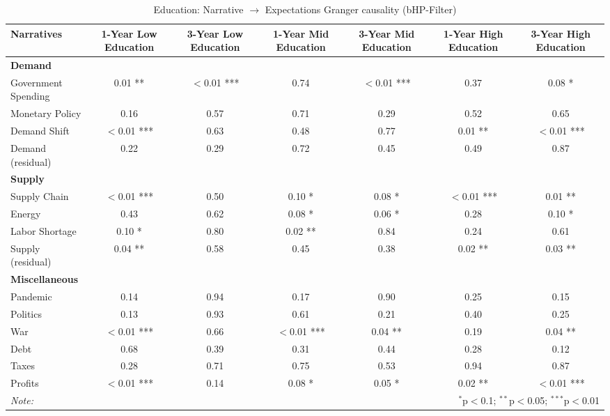 \begin{sidewaystable}[H]
\centering
\footnotesize
\caption{Education: Narrative $\rightarrow$ Expectations Granger causality (bHP-Filter)}\label{tab:granger_bHP_educ}

\begin{tabular}{lcccccc}
\toprule
\textbf{Narratives} & \textbf{1-Year Low Education} & \textbf{3-Year Low Education} & \textbf{1-Year Mid Education} & \textbf{3-Year Mid Education} & \textbf{1-Year High Education} & \textbf{3-Year High Education} \\
\midrule
\multicolumn{7}{l}{\textbf{Demand}} \\
\midrule
Government Spending & 0.01 ** & $<$0.01 *** & 0.74 & $<$0.01 *** & 0.37 & 0.08 * \\
Monetary Policy & 0.16 & 0.57 & 0.71 & 0.29 & 0.52 & 0.65 \\
Demand Shift & $<$0.01 *** & 0.63 & 0.48 & 0.77 & 0.01 ** & $<$0.01 *** \\
Demand (residual) & 0.22 & 0.29 & 0.72 & 0.45 & 0.49 & 0.87 \\
\midrule
\multicolumn{7}{l}{\textbf{Supply}} \\
\midrule
Supply Chain & $<$0.01 *** & 0.50 & 0.10 * & 0.08 * & $<$0.01 *** & 0.01 ** \\
Energy & 0.43 & 0.62 & 0.08 * & 0.06 * & 0.28 & 0.10 * \\
Labor Shortage & 0.10 * & 0.80 & 0.02 ** & 0.84 & 0.24 & 0.61 \\
Supply (residual) & 0.04 ** & 0.58 & 0.45 & 0.38 & 0.02 ** & 0.03 ** \\
\midrule
\multicolumn{7}{l}{\textbf{Miscellaneous}} \\
\midrule
Pandemic & 0.14 & 0.94 & 0.17 & 0.90 & 0.25 & 0.15 \\
Politics & 0.13 & 0.93 & 0.61 & 0.21 & 0.40 & 0.25 \\
War & $<$0.01 *** & 0.66 & $<$0.01 *** & 0.04 ** & 0.19 & 0.04 ** \\
Debt & 0.68 & 0.39 & 0.31 & 0.44 & 0.28 & 0.12 \\
Taxes & 0.28 & 0.71 & 0.75 & 0.53 & 0.94 & 0.87 \\
Profits & $<$0.01 *** & 0.14 & 0.08 * & 0.05 * & 0.02 ** & $<$0.01 *** \\
\midrule
\bottomrule
\textit{Note:}  & \multicolumn{6}{r}{$^{*}$p$<$0.1; $^{**}$p$<$0.05; $^{***}$p$<$0.01} \\
\bottomrule
\end{tabular}
\end{sidewaystable}
